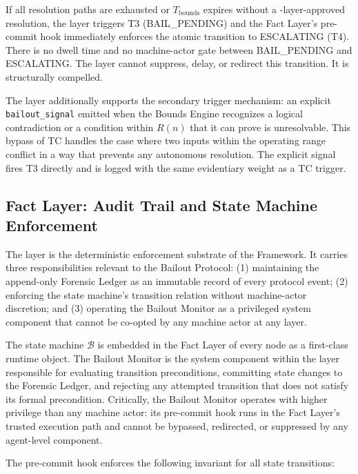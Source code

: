 If all resolution paths are exhausted or $T_{\text{bounds}}$ expires without a \fact-layer-approved resolution, the \bounds{} layer triggers T3 (BAIL\_PENDING) and the Fact Layer's pre-commit hook immediately enforces the atomic transition to ESCALATING (T4). There is no dwell time and no machine-actor gate between BAIL\_PENDING and ESCALATING. The \bounds{} layer cannot suppress, delay, or redirect this transition. It is structurally compelled.

The \bounds{} layer additionally supports the secondary trigger mechanism: an explicit \texttt{bailout\_signal} emitted when the Bounds Engine recognizes a logical contradiction or a condition within $R(n)$ that it can prove is unresolvable. This bypass of TC handles the case where two inputs within the operating range conflict in a way that prevents any autonomous resolution. The explicit signal fires T3 directly and is logged with the same evidentiary weight as a TC trigger.

\subsection{Fact Layer: Audit Trail and State Machine Enforcement}
\label{sec:impl:fact}

The \fact{} layer is the deterministic enforcement substrate of the \bxthree{} Framework. It carries three responsibilities relevant to the Bailout Protocol: (1) maintaining the append-only Forensic Ledger as an immutable record of every protocol event; (2) enforcing the state machine's transition relation without machine-actor discretion; and (3) operating the Bailout Monitor as a privileged system component that cannot be co-opted by any machine actor at any layer.

The state machine $\mathcal{B}$ is embedded in the Fact Layer of every node as a first-class runtime object. The Bailout Monitor is the system component within the \fact{} layer responsible for evaluating transition preconditions, committing state changes to the Forensic Ledger, and rejecting any attempted transition that does not satisfy its formal precondition. Critically, the Bailout Monitor operates with higher privilege than any machine actor: its pre-commit hook runs in the Fact Layer's trusted execution path and cannot be bypassed, redirected, or suppressed by any agent-level component.

The pre-commit hook enforces the following invariant for all state transitions:

